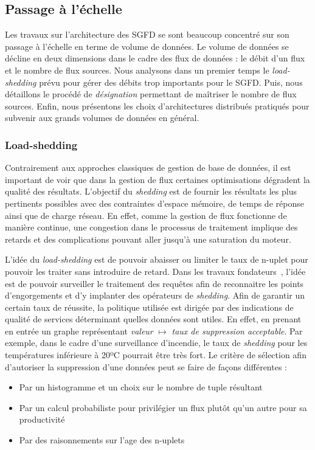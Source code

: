\subsection{Passage à l'échelle}
Les travaux sur l'architecture des SGFD se sont beaucoup concentré sur son passage à l'échelle en terme de volume de données. Le volume de données se décline en deux dimensions dans le cadre des flux de données : le débit d'un flux et le nombre de flux sources. Nous analysons dans un premier temps le \textit{load-shedding} prévu pour gérer des débits trop importants pour le SGFD. Puis, nous détaillons le procédé de \textit{désignation} permettant de maîtriser le nombre de flux sources. Enfin, nous présentons les choix d'architectures distribués pratiqués pour subvenir aux grands volumes de données en général.

\subsubsection{Load-shedding}
Contrairement aux approches classiques de gestion de base de données, il est important de voir que dans la gestion de flux certaines optimisations dégradent la qualité des résultats. L'objectif du \textit{shedding} est de fournir les résultats les plus pertinents possibles avec des contraintes d'espace mémoire, de temps de réponse ainsi que de charge réseau. En effet, comme la gestion de flux fonctionne de manière continue, une congestion dans le processus de traitement implique des retards et des complications pouvant aller jusqu'à une saturation du moteur.

L'idée du \textit{load-shedding} est de pouvoir abaisser ou limiter le taux de n-uplet pour pouvoir les traiter sans introduire de retard. Dans les travaux fondateurs~\cite{Tatbul:window,Tatbul:load-shedding}, l'idée est de pouvoir surveiller le traitement des requêtes afin de reconnaitre les points d'engorgements et d'y implanter des opérateurs de \textit{shedding}. Afin de garantir un certain taux de réussite, la politique utilisée est dirigée par des indications de qualité de services déterminant quelles données sont utiles. En effet, en prenant en entrée un graphe représentant \textit{valeur} $\mapsto$  \textit{taux de suppression acceptable}. Par exemple, dans le cadre d'une surveillance d'incendie, le taux de \textit{shedding} pour les températures inférieure à 20ºC pourrait être très fort. Le critère de sélection afin d'autoriser la suppression d'une données peut se faire de façons différentes :
\begin{itemize}
 \item Par un histogramme et un choix sur le nombre de tuple résultant~\cite{Han:join}
 \item Par un calcul probabiliste pour privilégier un flux plutôt qu'un autre pour sa productivité~\cite{Han:join}
 \item Par des raisonnements sur l'age des n-uplets~\cite{Srivastava:join}
\end{itemize}


